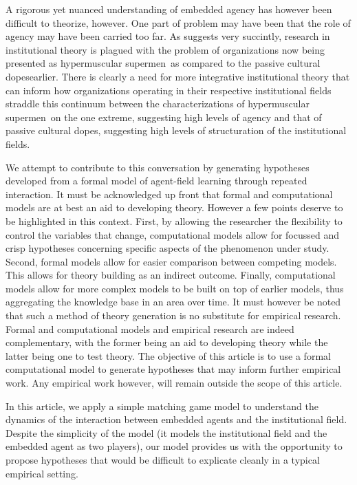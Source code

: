 \documentclass[12pt,letterpaper]{article}
\begin{document}
A rigorous yet nuanced understanding of embedded agency has however been difficult to theorize, however. One part of problem may have been that the role of agency may have been carried too far. As \cite{Suddaby2010} suggests very succintly,  research in institutional theory is plagued with the problem of organizations now being presented as \textquotesingle hypermuscular supermen\textquotesingle \ as compared to the \textquotesingle passive cultural dopes\textquotesingle  earlier. There is clearly a need for more integrative institutional theory that can inform how organizations operating in their respective institutional fields straddle this continuum between the characterizations of \textquotesingle hypermuscular supermen\textquotesingle  \ on the one extreme, suggesting high levels of agency and that of \textquotesingle passive cultural dopes\textquotesingle , suggesting high levels of structuration of the institutional fields.

We attempt to contribute to this conversation by generating hypotheses developed from a formal model of agent-field learning through repeated interaction. It must be acknowledged up front that formal and computational models are at best an aid to developing theory. However a few points deserve to be highlighted in this context. First, by allowing the researcher the flexibility to control the variables that change, computational models allow for focussed and crisp hypotheses concerning specific aspects of the phenomenon under study. Second, formal models allow for easier comparison between competing models. This allows for theory building as an indirect outcome. Finally, computational models allow for more complex models to be built on top of earlier models, thus aggregating the knowledge base in an area over time. It must however be noted that such a method of theory generation is no substitute for empirical research. Formal and computational models and empirical research are indeed complementary, with the former being an aid to developing theory while the latter being one to test theory. The objective of this article is to use a formal computational model to generate hypotheses that may inform further empirical work. Any empirical work however, will remain outside the scope of this article.

In this article, we apply a simple matching game model to  understand the dynamics of the interaction between embedded agents and the institutional field. Despite the simplicity of the model (it models the institutional field and the embedded agent as two players), our model provides us with the opportunity to propose hypotheses that would be difficult to explicate cleanly in a typical empirical setting.
\end{document}
